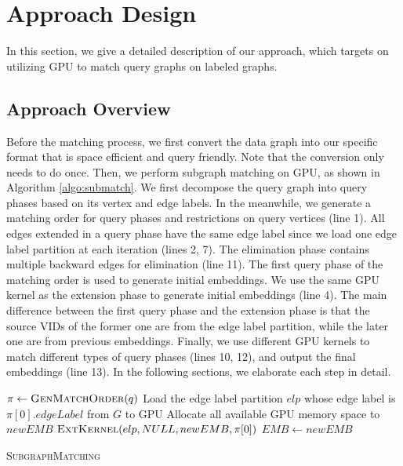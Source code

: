 \section{Approach Design}
In this section, we give a detailed description of our approach, which targets on utilizing GPU to match query graphs on labeled graphs.
\subsection{Approach Overview}
Before the matching process, we first convert the data graph into our specific format that is space efficient and query friendly. Note that the conversion only needs to do once. Then, we perform subgraph matching on GPU, as shown in Algorithm \ref{algo:submatch}. We first decompose the query graph into query phases based on its vertex and edge labels. In the meanwhile, we generate a matching order for query phases and restrictions on query vertices (line 1). All edges extended in a query phase have the same edge label since we load one edge label partition at each iteration (lines 2, 7).
The elimination phase contains multiple backward edges for elimination (line 11). The first query phase of the matching order is used to generate initial embeddings. We use the same GPU kernel as the extension phase to generate initial embeddings (line 4). The main difference between the first query phase and the extension phase is that the source VIDs of the former one are from the edge label partition, while the later one are from previous embeddings. Finally, we use different GPU kernels to match different types of query phases (lines 10, 12), and output the final embeddings (line 13). In the following sections, we elaborate each step in detail.

\begin{algorithm}[t!]
$\pi \leftarrow \textsc{GenMatchOrder}(q)$\;
Load the edge label partition $elp$ whose edge label is $\pi[0].edgeLabel$ from $G$ to GPU\;
Allocate all available GPU memory space to $newEMB$\;
$\textsc{ExtKernel}(elp,NULL,newEMB,\pi[0])$\;
$EMB \leftarrow newEMB$\;
\caption{\textsc{SubgraphMatching}}
\label{algo:submatch}
\end{algorithm}


